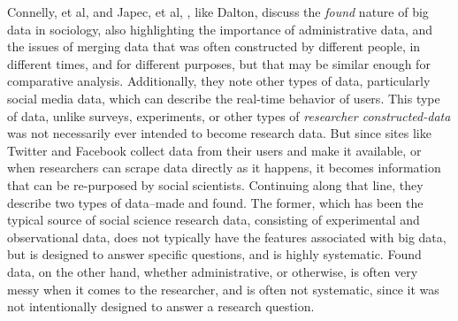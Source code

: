\documentclass[sigconf]{acmart}
\begin{document}
Connelly, et al, and Japec, et al, \cite {connelly16} \cite {japec15}, like Dalton, discuss the {\em found} nature of big data in sociology, also highlighting the importance of administrative data, and the issues of merging data that was often constructed by different people, in different times, and for different purposes, but that may be similar enough for comparative analysis.  Additionally, they note other types of data, particularly social media data, which can describe the real-time behavior of users.  This type of data, unlike surveys, experiments, or other types of {\em researcher constructed-data} was not necessarily ever intended to become research data.  But since sites like Twitter and Facebook collect data from their users and make it available, or when researchers can scrape data directly as it happens, it becomes information that can be re-purposed by social scientists.  Continuing along that line, they describe two types of data--made and found.  The former, which has been the typical source of social science research data, consisting of experimental and observational data, does not typically have the features associated with big data, but is designed to answer specific questions, and is highly systematic.  Found data, on the other hand, whether administrative, or otherwise, is often very messy when it comes to the researcher, and is often not systematic, since it was not intentionally designed to answer a research question.  
\end{document}
